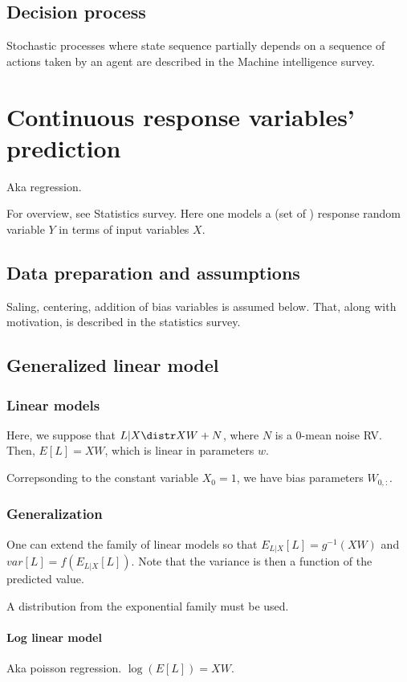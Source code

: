 \documentclass[oneside, article]{memoir}
\begin{document}
\section{Decision process}
Stochastic processes where state sequence partially depends on a sequence of actions taken by an agent are described in the Machine intelligence survey.

\chapter{Continuous response variables' prediction}
Aka regression.

For overview, see Statistics survey. Here one models a (set of ) response random variable $Y$ in terms of input variables $X$.

\section{Data preparation and assumptions}
Saling, centering, addition of bias variables is assumed below. That, along with motivation, is described in the statistics survey.

\section{Generalized linear model}
\subsection{Linear models}
Here, we suppose that $L|X \distr XW + N$, where $N$ is a 0-mean noise RV. Then, $E[L] = XW$, which is linear in parameters $w$.

Correpsonding to the constant variable $X_0 = 1$, we have bias parameters $W_{0,:}$.

\subsection{Generalization}
One can extend the family of linear models so that $E_{L|X}[L] = g^{-1}(XW)$ and $var[L] = f(E_{L|X}[L])$. Note that the variance is then a function of the predicted value.

A distribution from the exponential family must be used.

\subsubsection{Log linear model}
Aka poisson regression. $\log(E[L]) = XW$.
\end{document}
